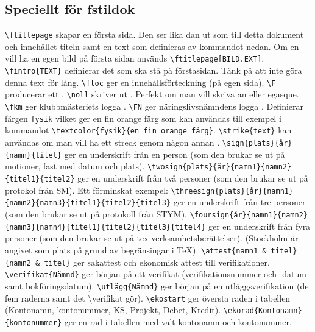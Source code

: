\documentclass{fstildok}
\newcommand{\bs}{\textbackslash}
\begin{document}
\subsection{Speciellt för fstildok}
\begin{punkter}
\punkt \texttt{\bs ftitlepage} skapar en första sida. Den ser lika dan ut som till detta dokument och innehållet titeln samt en text som definieras av kommandot nedan. Om en vill ha en egen bild på första sidan används \texttt{\bs ftitlepage[BILD.EXT]}.
\punkt \texttt{\bs fintro\{TEXT\}} definierar det som ska stå på förstasidan. Tänk på att inte göra denna text för lång.
\punkt \texttt{\bs ftoc} ger en innehållsförteckning (på egen sida).
\punkt \texttt{\bs F} producerar ett \F.
\punkt \texttt{\bs noll} skriver ut \noll. Perfekt om man vill skriva \noll an eller \noll egasque.
\punkt \texttt{\bs fkm} ger klubbmästeriets logga \fkm.
\punkt \texttt{\bs FN} ger näringslivsnämndens logga \FN.
\punkt Definierar färgen \texttt{fysik} vilket ger \textcolor{fysik}{en fin orange färg} som kan användas till exempel i kommandot \texttt{\bs textcolor\{fysik\}\{en fin orange färg\}}.
\punkt \texttt{\bs strike\{text\}} kan användas om man vill ha ett streck genom någon annan .
\punkt \texttt{\bs sign\{plats\}\{år\}\{namn\}\{titel\}} ger en underskrift från en person (som den brukar se ut på motioner, fast med datum och plats).
\punkt \texttt{\bs twosign\{plats\}\{år\}\{namn1\}\{namn2\}\{titel1\}\{titel2\}} ger en underskrift från två personer (som den brukar se ut på protokol från SM). Ett förminskat exempel: {\footnotesize
{}
}
\punkt \texttt{\bs threesign\{plats\}\{år\}\{namn1\}\{namn2\}\{namn3\}\{titel1\}\{titel2\}\{titel3\}} ger en underskrift från tre personer (som den brukar se ut på protokoll från STYM).
\punkt \texttt{\bs foursign\{år\}\{namn1\}\{namn2\}\{namn3\}\{namn4\}\{titel1\}\{titel2\}\{titel3\}\{titel4\}} ger en underskrift från fyra personer (som den brukar se ut på tex verksamhetsberättelser). (Stockholm är angivet som plats på grund av begränsingar i \TeX).
\punkt \texttt{\bs attest\{namn1 \& titel\}\{namn2 \& titel\}} ger sakattest och ekonomisk attest till verifikationer.
\punkt \texttt{\bs verifikat\{Nämnd\}} ger början på ett verifikat (verifikationsnummer och -datum samt bokföringsdatum).
\punkt \texttt{\bs utlägg\{Nämnd\}} ger början på en utläggsverifikation (de fem raderna samt det \bs verifikat{} gör).
\punkt \texttt{\bs ekostart} ger översta raden i tabellen (Kontonamn, kontonummer, KS, Projekt, Debet, Kredit).
\punkt \texttt{\bs ekorad\{Kontonamn\}\{kontonummer\}} ger en rad i tabellen med valt kontonamn och kontonummer.

\end{punkter}
\end{document}
